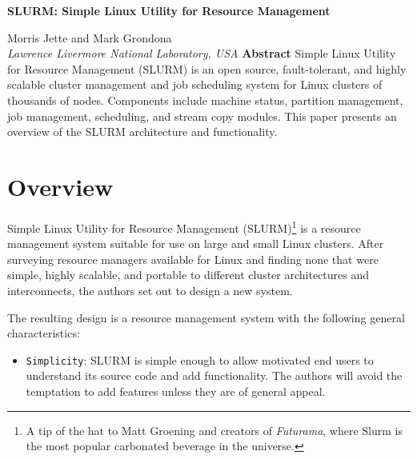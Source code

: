 \documentclass[10pt,onecolumn,times]{../common/llncs}
\def\ctit{SLURM: Simple Linux Utility for Resource \linebreak
Management}
\def\ucrl{UCRL-JC-147996 REV 1}
\def\auth{Morris Jette \\ Mark Grondona}
\def\pubdate{June 23, 2003}
\def\journal{ClusterWorld Conference and Expo}
\begin{document}

\vspace*{35mm}
\noindent\Large
\textbf{\ctit}
\baselineskip
\noindent\large
{Morris Jette and Mark Grondona \\
{\em Lawrence Livermore National Laboratory, USA}
\baselineskip
\noindent\large
\textbf{Abstract}
\baselineskip
\noindent\normalsize
Simple Linux Utility for Resource Management (SLURM) is an open source,
fault-tolerant, and highly scalable cluster management and job scheduling
system for Linux clusters of thousands of nodes.  Components include
machine status, partition management, job management, scheduling, and
stream copy modules.  This paper presents an overview of the SLURM
architecture and functionality.

\newcommand{\munged}{{\tt munged}}
\newcommand{\srun}{{\tt srun}}
\newcommand{\scancel}{{\tt scancel}}
\newcommand{\squeue}{{\tt squeue}}
\newcommand{\scontrol}{{\tt scontrol}}
\newcommand{\sinfo}{{\tt sinfo}}
\newcommand{\slurmctld}{{\tt slurmctld}}
\newcommand{\slurmd}{{\tt slurmd}}


\section{Overview}

Simple Linux Utility for Resource Management (SLURM)\footnote{A tip of 
the hat to Matt Groening and creators of {\em Futurama},
where Slurm is the most popular carbonated beverage in the universe.} 
is a resource management system suitable for use on large and small Linux 
clusters.  After surveying \cite{Jette2002} resource managers available 
for Linux and finding none that were simple, highly scalable, and portable 
to different cluster architectures and interconnects, the authors set out 
to design a new system.

The resulting design is a resource management system with the following general
characteristics:

\begin{itemize}
\item {\tt Simplicity}: SLURM is simple enough to allow motivated end users
to understand its source code and add functionality.  The authors will 
avoid the temptation to add features unless they are of general appeal. 


\end{itemize}}
\end{document}
